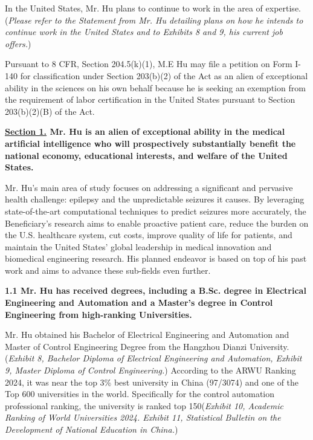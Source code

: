 \documentclass{article}
\begin{document}
In the United States, Mr. Hu plans to continue to work in the area of expertise. ({\it Please refer to the Statement from Mr. Hu detailing plans on how he intends to continue work in the United States and to Exhibits 8 and 9, his current job offers.})

Pursuant to 8 CFR, Section 204.5(k)(1), M.E Hu may file a petition on Form I-140 for classification under Section 203(b)(2) of the Act as an alien of exceptional ability in the sciences on his own behalf because he is seeking an exemption from the requirement of labor certification in the United States pursuant to Section 203(b)(2)(B) of the Act.

\clearpage

{\bf \underline{Section 1.} Mr. Hu is an alien of exceptional ability in the medical artificial intelligence who will prospectively substantially benefit the national economy, educational interests, and welfare of the United States.}

Mr. Hu's main area of study focuses on addressing a significant and pervasive health challenge: epilepsy and the unpredictable seizures it causes. By leveraging state-of-the-art computational techniques to predict seizures more accurately, the Beneficiary's research aims to enable proactive patient care, reduce the burden on the U.S. healthcare system, cut costs, improve quality of life for patients, and maintain the United States’ global leadership in medical innovation and biomedical engineering research. His planned endeavor is based on top of his past work and aims to advance these sub-fields even further.

 
{\bf 1.1 Mr. Hu has received degrees, including a B.Sc. degree in Electrical Engineering and Automation and a Master’s degree in Control Engineering  from high-ranking Universities. }

Mr. Hu obtained his Bachelor of Electrical Engineering and Automation and Master of Control Engineering Degree from the Hangzhou Dianzi University. ({\it Exhibit 8, Bachelor Diploma of Electrical Engineering and Automation, Exhibit 9, Master Diploma of Control Engineering.}) According to the ARWU Ranking 2024, it was near the top 3\%  best university in China (97/3074) and one of the Top 600 universities in the world. Specifically for the control automation professional ranking, the university is ranked top 150({\it Exhibit 10, Academic Ranking of World Universities 2024. Exhibit 11, Statistical Bulletin on the Development of National Education in China.}) 
\end{document}
